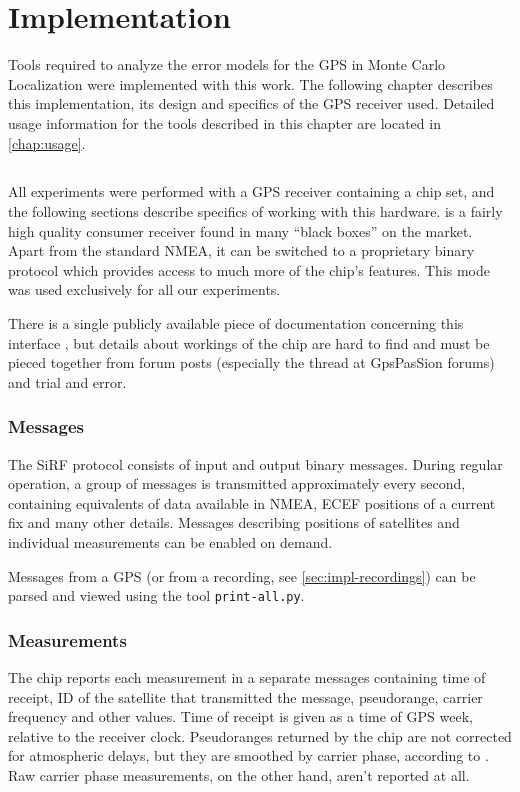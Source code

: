 \chapter{Implementation}
\label{chap:implementation}

Tools required to analyze the error models for the GPS in Monte Carlo Localization
were implemented with this work.
The following chapter describes this implementation, its design and
specifics of the GPS receiver used.
Detailed usage information for the tools described in this chapter are located in
\cref{chap:usage}.

\section{\sirf}
\label{sec:impl-sirf}

All experiments were performed with a GPS receiver containing
a \sirf chip set, and the following sections describe specifics of working with
this hardware.
\sirf is a fairly high quality consumer receiver found in many
\enquote{black boxes} on the market.
Apart from the standard NMEA, it can be switched to a proprietary binary protocol
which provides access to much more of the chip's features.
This mode was used exclusively for all our experiments.

There is a single publicly available piece of documentation concerning this
interface \cite{sirf-protocol}, but details about workings of the chip are hard
to find and must be pieced together from forum posts (especially the thread
\cite{gpspassion-sirf} at GpsPasSion forums) and trial and error.

\subsection{Messages}
The SiRF protocol consists of input and output binary messages.
During regular operation, a group of messages is transmitted approximately every second,
containing equivalents of data available in NMEA, ECEF positions of a current
fix and many other details.
Messages describing positions of satellites and individual measurements can be
enabled on demand.

Messages from a GPS (or from a recording, see \cref{sec:impl-recordings}) can be
parsed and viewed using the tool \verb=print-all.py=.

\subsection{Measurements}
The \sirf chip reports each measurement in a separate messages containing
time of receipt, ID of the satellite that transmitted the message, pseudorange,
carrier frequency and other values.
Time of receipt is given as a time of GPS week, relative to the receiver clock.
Pseudoranges returned by the \sirf chip are not corrected for atmospheric delays,
but they are smoothed by carrier phase, according to \cite{sirf-protocol}.
Raw carrier phase measurements, on the other hand, aren't reported at all.

